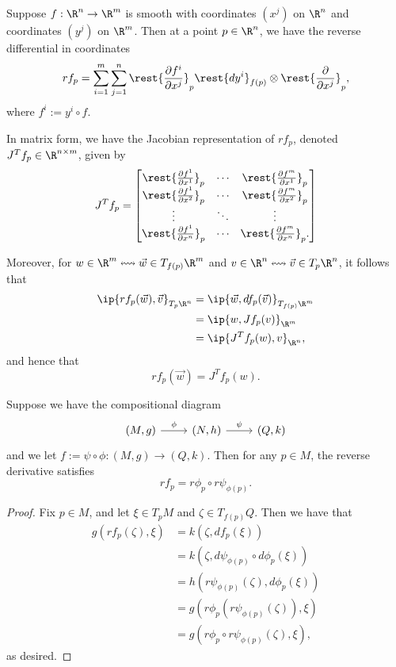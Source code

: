 \begin{ex}
	Suppose $f:\R^n\to\R^m$ is smooth with coordinates $(x^j)$ on $\R^n$ and coordinates $(y^j)$ on $\R^m$.  Then at a point $p\in\R^n$, we have the reverse differential in coordinates
	$$rf_p=\sum_{i=1}^m\sum_{j=1}^n\rest{\frac{\partial f^i}{\partial x^j}}_p\rest{dy^i}_{f(p)}\otimes\rest{\frac{\partial}{\partial x^j}}_p,$$
	where $f^i:=y^i\circ f$.
	
	In matrix form, we have the Jacobian representation of $rf_p$, denoted $J^Tf_p\in\R^{n\times m}$, given by
	$$J^Tf_p=\begin{bmatrix}
		\rest{\frac{\partial f^1}{\partial x^1}}_p&\cdots&\rest{\frac{\partial f^m}{\partial x^1}}_p\\
		\rest{\frac{\partial f^1}{\partial x^2}}_p&\cdots&\rest{\frac{\partial f^m}{\partial x^2}}_p\\
		\vdots&\ddots&\vdots\\
		\rest{\frac{\partial f^1}{\partial x^n}}_p&\cdots&\rest{\frac{\partial f^m}{\partial x^n}}_p.
	\end{bmatrix}$$
	
	Moreover, for $w\in\R^m\leftrightsquigarrow\vec{w}\in T_{f(p)}\R^m$ and $v\in\R^n\leftrightsquigarrow\vec{v}\in T_p\R^n$, it follows that
	\begin{align*}
		\ip{rf_p(\vec{w}),\vec{v}}_{T_p\R^n}&=\ip{\vec{w},df_p(\vec{v})}_{T_{f(p)}\R^m}\\
		&=\ip{w,Jf_p(v)}_{\R^m}\\
		&=\ip{J^Tf_p(w),v}_{\R^n},
	\end{align*}
	 and hence that
	 $$rf_p(\vec{w})=J^Tf_p(w).$$
\end{ex}


\begin{prop}
	Suppose we have the compositional diagram
	\begin{equation*}
		\begin{tikzcd}
			(M,g)
			\arrow[r, "\phi"]
			&(N, h)
			\arrow[r, "\psi"]
			&(Q,k)
		\end{tikzcd}
	\end{equation*}
	and we let $f:=\psi\circ\phi:(M,g)\to(Q,k).$
	Then for any $p\in M$, the reverse derivative satisfies
	$$rf_p=r\phi_p\circ r\psi_{\phi(p)}.$$
\end{prop}

\begin{proof}
Fix $p\in M$, and let $\xi\in T_pM$ and $\zeta\in T_{f(p)}Q$.  Then we have that
\begin{align*}
	g(rf_p(\zeta),\xi)&=k(\zeta,df_p(\xi))\\
	&=k(\zeta,d\psi_{\phi(p)}\circ d\phi_p(\xi))\\
	&=h(r\psi_{\phi(p)}(\zeta),d\phi_p(\xi))\\
	&=g(r\phi_p(r\psi_{\phi(p)}(\zeta)),\xi)\\
	&=g(r\phi_p\circ r\psi_{\phi(p)}(\zeta),\xi),
\end{align*}
as desired.
\end{proof}


